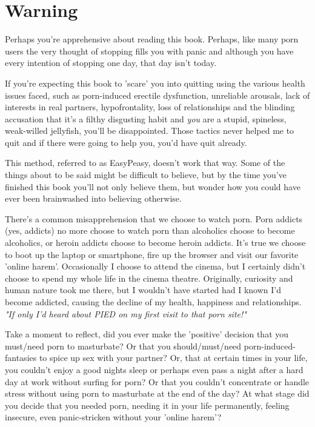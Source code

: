 \documentclass[easypeasy.tex]{subfiles}
\begin{document}
\section{Warning}
Perhaps you're apprehensive about reading this book. Perhaps, like many porn users the very thought of stopping fills you with panic and although you have every intention of stopping one day, that day isn't today.

If you're expecting this book to 'scare' you into quitting using the various health issues faced, such as porn-induced erectile dysfunction, unreliable arousals, lack of interests in real partners, hypofrontality, loss of relationships and the blinding accusation that it's a filthy disgusting habit and \textit{you} are a stupid, spineless, weak-willed jellyfish, you'll be disappointed. Those tactics never helped me to quit and if there were going to help you, you'd have quit already.

This method, referred to as EasyPeasy, doesn't work that way. Some of the things about to be said might be difficult to believe, but by the time you've finished this book you'll not only believe them, but wonder how you could have ever been brainwashed into believing otherwise.

There's a common misapprehension that we choose to watch porn. Porn addicts (yes, addicts) no more choose to watch porn than alcoholics choose to become alcoholics, or heroin addicts choose to become heroin addicts. It's true we choose to boot up the laptop or smartphone, fire up the browser and visit our favorite 'online harem'. Occasionally I choose to attend the cinema, but I certainly didn't choose to spend my whole life in the cinema theatre. Originally, curiosity and human nature took me there, but I wouldn't have started had I known I'd become addicted, causing the decline of my health, happiness and relationships.
\textit{"If only I'd heard about PIED on my first visit to that porn site!"}

Take a moment to reflect, did you ever make the 'positive' decision that you must/need porn to masturbate? Or that you should/must/need porn-induced-fantasies to spice up sex with your partner? Or, that at certain times in your life, you couldn't enjoy a good nights sleep or perhaps even pass a night after a hard day at work without surfing for porn? Or that you couldn't concentrate or handle stress without using porn to masturbate at the end of the day? At what stage did you decide that you needed porn, needing it in your life permanently, feeling insecure, even panic-stricken without your 'online harem'?
\end{document}
